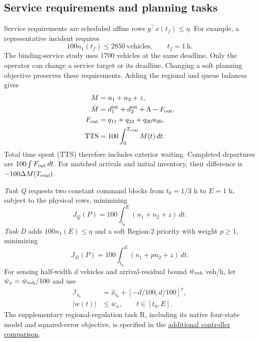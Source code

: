 \documentclass[preprint,12pt]{elsarticle}
\newcommand{\reproductiondetails}[1]{\href{https://github.com/AlienEslami/agentic-perimeter-runtime-certification/blob/main/paper/supporting_materials/REPRODUCING_THE_REDUCED_PAPER.md}{#1}}
\begin{document}
\subsection{Service requirements and planning tasks}
\label{sec:benchmark-formulation}

Service requirements are scheduled affine rows $g^\top x(t_f)\le\eta$.
For example, a representative incident requires
\begin{equation}
100n_1(t_f)\le2850\ \text{vehicles},\qquad t_f=1\ \text{h}.
\label{eq:new-service}
\end{equation}
The binding-service study uses 1700 vehicles at the same deadline. Only
the operator can change a service target or its deadline. Changing a soft
planning objective preserves these requirements.
Adding the regional and queue balances gives
\begin{equation}
\begin{aligned}
M&=n_1+n_2+z,\\
\dot M&=d^{\rm int}_1+d^{\rm int}_2+\Lambda-F_{\rm out},\\
F_{\rm out}&=q_{11}+q_{22}+q_{20}u_{20},\\
\mathrm{TTS}&=100\int_0^{T_{\rm eval}} M(t)\,dt.
\end{aligned}
\label{eq:new-conservation}
\end{equation}
Total time spent (TTS) therefore includes exterior waiting. Completed
departures are $100\int F_{\rm out}\,dt$. For matched arrivals and initial
inventory, their difference is $-100\Delta M(T_{\rm eval})$.

\emph{Task Q} requests two constant command blocks from $t_0=1/3$ h to
$E=1$ h, subject to the physical rows, minimizing
\begin{equation}
J_Q(P)=100\int_{t_0}^{E}(n_1+n_2+z)\,dt.
\label{eq:benchmark-queue-cost}
\end{equation}
\emph{Task D} adds $100n_1(E)\le\eta$ and a soft Region-2 priority with
weight $p\ge1$, minimizing
\begin{equation}
J_D(P)=100\int_{t_0}^{E}(n_1+p n_2+z)\,dt.
\label{eq:benchmark-priority-cost}
\end{equation}
For sensing half-width $d$ vehicles and arrival-residual bound
$\bar w_{\rm veh}$ veh/h, let $\bar w_x=\bar w_{\rm veh}/100$ and use
\begin{equation}
\begin{aligned}
\mathcal I_{t_0}&=\widehat x_{t_0}+[-d/100,d/100]^7,\\
|w(t)|&\le\bar w_x,\qquad t\in[t_0,E].
\end{aligned}
\label{eq:benchmark-contract}
\end{equation}
The supplementary regional-regulation task R, including its native
four-state model and squared-error objective, is specified in the
\reproductiondetails{additional controller comparison}.
\end{document}
